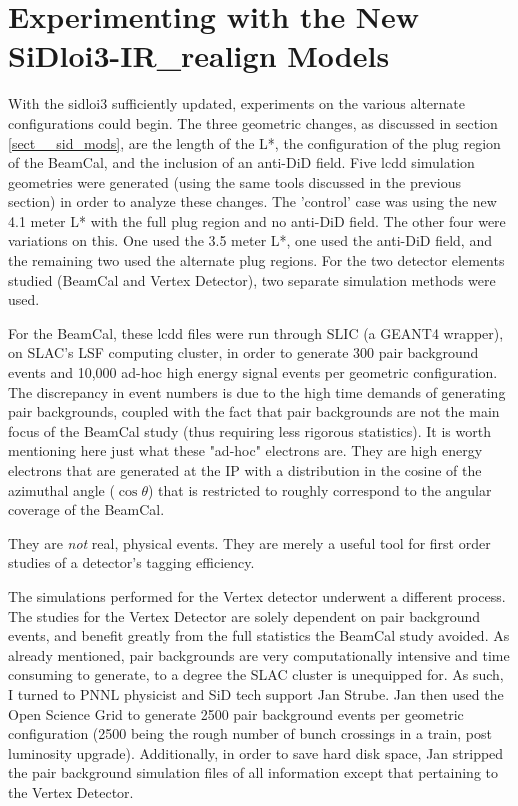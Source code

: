 \documentclass{report}
\begin{document}
        \section{Experimenting with the New SiDloi3-IR\_realign Models}
            With the sidloi3 sufficiently updated, experiments on the various alternate configurations could begin. The three geometric changes, as discussed in section \ref{sect__sid_mods}, are the length of the L*, the configuration of the plug region of the BeamCal, and the inclusion of an anti-DiD field. Five lcdd simulation geometries were generated (using the same tools discussed in the previous section) in order to analyze these changes. The 'control' case was using the new 4.1 meter L* with the full plug region and no anti-DiD field. The other four were variations on this. One used the 3.5 meter L*, one used the anti-DiD field, and the remaining two used the alternate plug regions. For the two detector elements studied (BeamCal and Vertex Detector), two separate simulation methods were used. 

            For the BeamCal, these lcdd files were run through SLIC (a GEANT4 wrapper), on SLAC's LSF computing cluster, in order to generate 300 pair background events and 10,000 ad-hoc high energy signal events per geometric configuration. The discrepancy in event numbers is due to the high time demands of generating pair backgrounds, coupled with the fact that pair backgrounds are not the main focus of the BeamCal study (thus requiring less rigorous statistics). It is worth mentioning here just what these "ad-hoc" electrons are. They are high energy electrons that are generated at the IP with a distribution in the cosine of the azimuthal angle ($\cos\theta$) that is restricted to roughly correspond to the angular coverage of the BeamCal.
            
            They are \textit{not} real, physical events. They are merely a useful tool for first order studies of a detector's tagging efficiency.

            The simulations performed for the Vertex detector underwent a different process. The studies for the Vertex Detector are solely dependent on pair background events, and benefit greatly from the full statistics the BeamCal study avoided. As already mentioned, pair backgrounds are very computationally intensive and time consuming to generate, to a degree the SLAC cluster is unequipped for. As such, I turned to PNNL physicist and SiD tech support Jan Strube. Jan then used the Open Science Grid to generate 2500 pair background events per geometric configuration (2500 being the rough number of bunch crossings in a train, post luminosity upgrade). Additionally, in order to save hard disk space, Jan stripped the pair background simulation files of all information except that pertaining to the Vertex Detector. 
\end{document}
